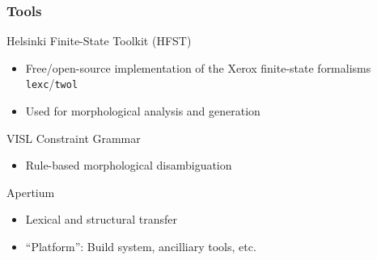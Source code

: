 \documentclass[10pt,xetex]{beamer} %
\begin{document}
\begin{frame}
  \frametitle{Tools}

  \begin{block}{Helsinki Finite-State Toolkit (HFST)}
    \begin{itemize}
      \item Free/open-source implementation of the Xerox 
         finite-state formalisms {\small {\tt lexc}}/{\small {\tt twol}}
      \item Used for morphological analysis and generation
    \end{itemize}
  \end{block}
  
  \begin{block}{VISL Constraint Grammar}
    \begin{itemize}
      \item Rule-based morphological disambiguation
    \end{itemize}
  \end{block}
  
  \begin{block}{Apertium}
    \begin{itemize}
      \item Lexical and structural transfer
      \item ``Platform'': Build system, ancilliary tools, etc.
    \end{itemize}
  \end{block}
  
\end{frame}
\end{document}
